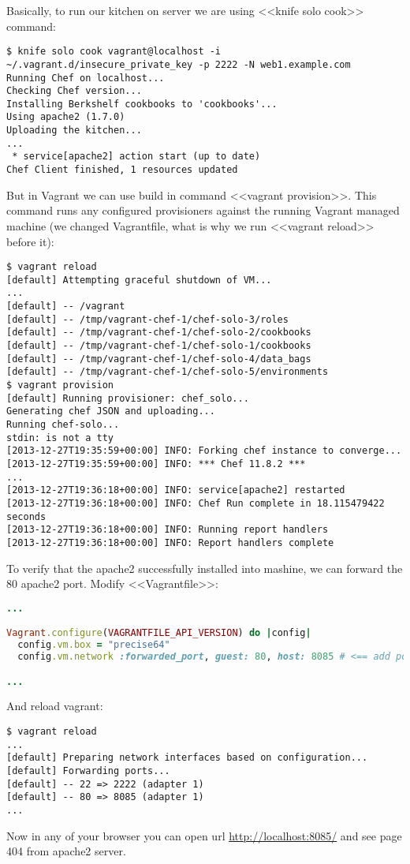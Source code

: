 Basically, to run our kitchen on server we are using <<knife solo cook>> command:

\begin{lstlisting}[label=lst:my-cloud-vagrant11]
$ knife solo cook vagrant@localhost -i ~/.vagrant.d/insecure_private_key -p 2222 -N web1.example.com
Running Chef on localhost...
Checking Chef version...
Installing Berkshelf cookbooks to 'cookbooks'...
Using apache2 (1.7.0)
Uploading the kitchen...
...
 * service[apache2] action start (up to date)
Chef Client finished, 1 resources updated
\end{lstlisting}

But in Vagrant we can use build in command <<vagrant provision>>. This command runs any configured provisioners against the running Vagrant managed machine (we changed Vagrantfile, what is why we run <<vagrant reload>> before it):

\begin{lstlisting}[label=lst:my-cloud-vagrant8]
$ vagrant reload
[default] Attempting graceful shutdown of VM...
...
[default] -- /vagrant
[default] -- /tmp/vagrant-chef-1/chef-solo-3/roles
[default] -- /tmp/vagrant-chef-1/chef-solo-2/cookbooks
[default] -- /tmp/vagrant-chef-1/chef-solo-1/cookbooks
[default] -- /tmp/vagrant-chef-1/chef-solo-4/data_bags
[default] -- /tmp/vagrant-chef-1/chef-solo-5/environments
$ vagrant provision
[default] Running provisioner: chef_solo...
Generating chef JSON and uploading...
Running chef-solo...
stdin: is not a tty
[2013-12-27T19:35:59+00:00] INFO: Forking chef instance to converge...
[2013-12-27T19:35:59+00:00] INFO: *** Chef 11.8.2 ***
...
[2013-12-27T19:36:18+00:00] INFO: service[apache2] restarted
[2013-12-27T19:36:18+00:00] INFO: Chef Run complete in 18.115479422 seconds
[2013-12-27T19:36:18+00:00] INFO: Running report handlers
[2013-12-27T19:36:18+00:00] INFO: Report handlers complete
\end{lstlisting}

To verify that the apache2 successfully installed into mashine, we can forward the 80 apache2 port. Modify <<Vagrantfile>>:

\begin{lstlisting}[language=Ruby, label=lst:my-cloud-vagrant9,title=my-cloud/nodes/Vagrantfile]
...

Vagrant.configure(VAGRANTFILE_API_VERSION) do |config|
  config.vm.box = "precise64"
  config.vm.network :forwarded_port, guest: 80, host: 8085 # <== add port forwarding

...
\end{lstlisting}

And reload vagrant:

\begin{lstlisting}[label=lst:my-cloud-vagrant10]
$ vagrant reload
...
[default] Preparing network interfaces based on configuration...
[default] Forwarding ports...
[default] -- 22 => 2222 (adapter 1)
[default] -- 80 => 8085 (adapter 1)
...
\end{lstlisting}

Now in any of your browser you can open url \href{http://localhost:8085/}{http://localhost:8085/} and see page 404 from apache2 server.
